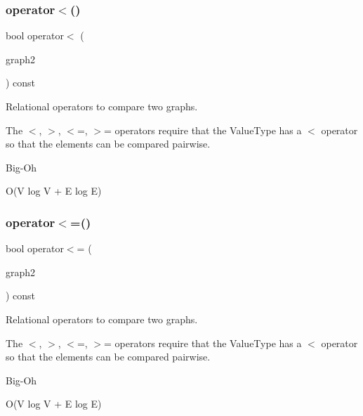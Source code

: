 \subsubsection{\texorpdfstring{operator$<$()}{operator<()}}
{\footnotesize\ttfamily bool operator$<$ (\begin{DoxyParamCaption}\item[{const \mbox{\hyperlink{classGraph}{Graph}}$<$ \mbox{\hyperlink{classVertexGen}{Vertex\+Gen}}$<$ V, E $>$, Edge\+Gen$<$ V, E $>$ $>$ \&}]{graph2 }\end{DoxyParamCaption}) const\hspace{0.3cm}{\ttfamily [inherited]}}



Relational operators to compare two graphs. 

The $<$, $>$, $<$=, $>$= operators require that the Value\+Type has a $<$ operator so that the elements can be compared pairwise. \begin{DoxyRefDesc}{Big-\/\+Oh}
\item[\mbox{\hyperlink{BigOh__BigOh000095}{Big-\/\+Oh}}]O(V log V + E log E) \end{DoxyRefDesc}
\mbox{\label{classGraph_a352607f2b21dd87b3d2a3957bbf3da7b}} 
\subsubsection{\texorpdfstring{operator$<$=()}{operator<=()}}
{\footnotesize\ttfamily bool operator$<$= (\begin{DoxyParamCaption}\item[{const \mbox{\hyperlink{classGraph}{Graph}}$<$ \mbox{\hyperlink{classVertexGen}{Vertex\+Gen}}$<$ V, E $>$, Edge\+Gen$<$ V, E $>$ $>$ \&}]{graph2 }\end{DoxyParamCaption}) const\hspace{0.3cm}{\ttfamily [inherited]}}



Relational operators to compare two graphs. 

The $<$, $>$, $<$=, $>$= operators require that the Value\+Type has a $<$ operator so that the elements can be compared pairwise. \begin{DoxyRefDesc}{Big-\/\+Oh}
\item[\mbox{\hyperlink{BigOh__BigOh000096}{Big-\/\+Oh}}]O(V log V + E log E) \end{DoxyRefDesc}
\mbox{\label{classGraph_a188f85939e3fe6ed2d411f622287f722}} 
